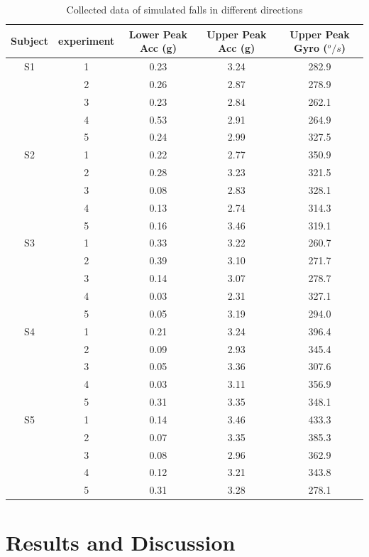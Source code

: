 \documentclass[letterpaper,12pt,titlepage,oneside,final]{book}
\let\origdoublepage\cleardoublepage
\newcommand{\clearemptydoublepage}{%
	\clearpage{\pagestyle{empty}\origdoublepage}}
\let\cleardoublepage\clearemptydoublepage
\begin{document}
\begin{table}[h]
	\begin{center}
		\begin{tabular}{ |c|c|c|c|c| } 
			\hline
			Subject & experiment & Lower Peak Acc (g) & Upper Peak Acc (g)  & Upper Peak Gyro ($^{o}/s$)\\
			\hline
			S1 & 1 & 0.23 & 3.24 & 282.9\\%
			& 2 & 0.26 & 2.87 & 278.9 \\
			& 3 & 0.23 & 2.84 & 262.1 \\
			& 4 & 0.53 &  2.91 & 264.9 \\
			& 5 & 0.24 &  2.99 & 327.5\\
			\hline
			S2 & 1 & 0.22 & 2.77 & 350.9\\
			& 2 &  0.28 &  3.23 & 321.5\\
			& 3 &  0.08 &  2.83& 328.1\\
			& 4 & 0.13 & 2.74 & 314.3\\
			& 5 & 0.16 & 3.46 & 319.1\\  %
			\hline
			S3 & 1 & 0.33 &  3.22& 260.7 \\
			& 2 &  0.39 & 3.10 & 271.7 \\
			& 3 & 0.14 & 3.07 & 278.7\\
			& 4 & 0.03 & 2.31 & 327.1\\
			& 5 & 0.05 & 3.19 & 294.0\\ %
			\hline
			S4 &1 & 0.21 & 3.24 & 396.4\\ 
			&2 &  0.09 & 2.93 & 345.4\\ 
			&3 & 0.05 & 3.36 & 307.6\\ 
			&4 & 0.03 & 3.11 & 356.9\\ 
			&5 & 0.31 & 3.35 & 348.1\\ %
			\hline
			S5 &1 & 0.14 & 3.46 & 433.3\\ 
			&2 &  0.07 & 3.35 & 385.3\\ 
			&3 & 0.08 & 2.96 & 362.9\\ 
			&4 & 0.12 & 3.21 & 343.8\\ 
			&5 & 0.31 & 3.28 & 278.1\\ %
			\hline
		\end{tabular}
		\caption{Collected data of simulated falls in different directions}
		\label{table:1}
	\end{center}
\end{table}
\cleardoublepage

\chapter{Results and Discussion}
\end{document}
